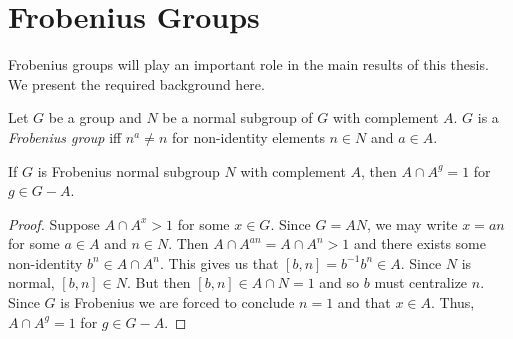 \documentclass[main.tex]{subfiles}
\begin{document}
\section{Frobenius Groups}

Frobenius groups will play an important role in the main results of this thesis. We present the required background here.

\begin{definition}
Let $G$ be a group and $N$ be a normal subgroup of $G$ with complement $A$. $G$ is a \emph{Frobenius group} iff $n^a \ne n$ for non-identity elements $n \in N$ and $a \in A$.
\end{definition}

\begin{lemma}
If $G$ is Frobenius normal subgroup $N$ with complement $A$, then $A \cap A^g = 1$ for $g \in G - A$.
\end{lemma}

\begin{proof}
Suppose $A \cap A^x > 1$ for some $x \in G$. Since $G = AN$, we may write $x = an$ for some $a \in A$ and $n \in N$. Then $A \cap A^{an} = A \cap A^n > 1$ and there exists some non-identity $b^n \in A \cap A^n$. This gives us that $[b,n] = b^{-1}b^n \in A$. Since $N$ is normal, $[b, n] \in N$. But then $[b,n] \in A \cap N = 1$ and so $b$ must centralize $n$. Since $G$ is Frobenius we are forced to conclude $n = 1$ and that $x \in A$. Thus, $A \cap A^g = 1$ for $g \in G - A$.
\end{proof}
\end{document}
